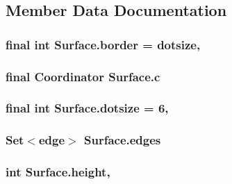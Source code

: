 \subsection{Member Data Documentation}
\hypertarget{classSurface_a35cca0a13938241e64e777cbaedc009d}{
\subsubsection[{border}]{\setlength{\rightskip}{0pt plus 5cm}final int Surface.\-border = {\bf dotsize}\hspace{0.3cm}{\ttfamily [static]}, {\ttfamily [private]}}}\label{classSurface_a35cca0a13938241e64e777cbaedc009d}
\hypertarget{classSurface_a3d62a7cdb6e1828d358841fc635100e8}{
\subsubsection[{c}]{\setlength{\rightskip}{0pt plus 5cm}final {\bf Coordinator} Surface.\-c\hspace{0.3cm}{\ttfamily [private]}}}\label{classSurface_a3d62a7cdb6e1828d358841fc635100e8}
\hypertarget{classSurface_ab1db9b83208286d2e4e1b90d4b360a6c}{
\subsubsection[{dotsize}]{\setlength{\rightskip}{0pt plus 5cm}final int Surface.\-dotsize = 6\hspace{0.3cm}{\ttfamily [static]}, {\ttfamily [private]}}}\label{classSurface_ab1db9b83208286d2e4e1b90d4b360a6c}
\hypertarget{classSurface_a14b4d5e0d634c3d8ddbcedce30a5ac29}{
\subsubsection[{edges}]{\setlength{\rightskip}{0pt plus 5cm}Set$<${\bf edge}$>$ Surface.\-edges\hspace{0.3cm}{\ttfamily [package]}}}\label{classSurface_a14b4d5e0d634c3d8ddbcedce30a5ac29}
\hypertarget{classSurface_ac7967deb54e276c07a00504f5259f325}{
\subsubsection[{height}]{\setlength{\rightskip}{0pt plus 5cm}int Surface.\-height\hspace{0.3cm}{\ttfamily [static]}, {\ttfamily [private]}}}\label{classSurface_ac7967deb54e276c07a00504f5259f325}
